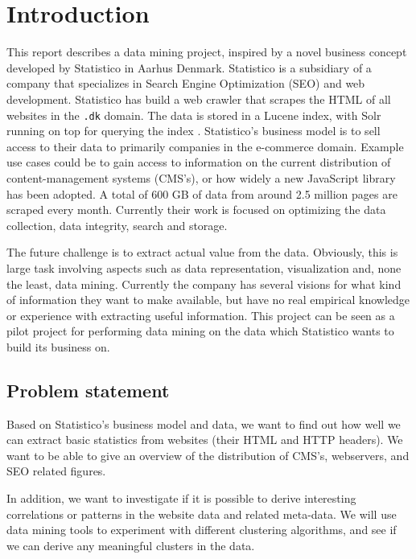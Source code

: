 \section{Introduction}
\label{sec:introduction}

This report describes a data mining project, inspired by a novel business concept developed by Statistico in Aarhus Denmark. Statistico is a subsidiary of a company that specializes in Search Engine Optimization (SEO) and web development. Statistico has build a web crawler that scrapes the HTML of all websites in the \texttt{.dk} domain. The data is stored in a Lucene index, with Solr running on top for querying the index \cite{lucene, solr}. Statistico's business model is to sell access to their data to primarily companies in the e-commerce domain. Example use cases could be to gain access to information on the current distribution of content-management systems (CMS's), or how widely a new JavaScript library has been adopted. A total of 600 GB of data from around 2.5 million pages are scraped every month. Currently their work is focused on optimizing the data collection, data integrity, search and storage.

The future challenge is to extract actual value from the data. Obviously, this is large task involving aspects such as data representation, visualization and, none the least, data mining. Currently the company has several visions for what kind of information they want to make available, but have no real empirical knowledge or experience with extracting useful information. This project can be seen as a pilot project for performing data mining on the data which Statistico wants to build its business on.


\subsection{Problem statement}
\label{subsec:problem_statement}

Based on Statistico's business model and data, we want to find out how well we can extract basic statistics from websites (their HTML and HTTP headers). We want to be able to give an overview of the distribution of CMS's, webservers, and SEO related figures.

In addition, we want to investigate if it is possible to derive interesting correlations or patterns in the website data and related meta-data. We will use data mining tools to experiment with different clustering algorithms, and see if we can derive any meaningful clusters in the data.

